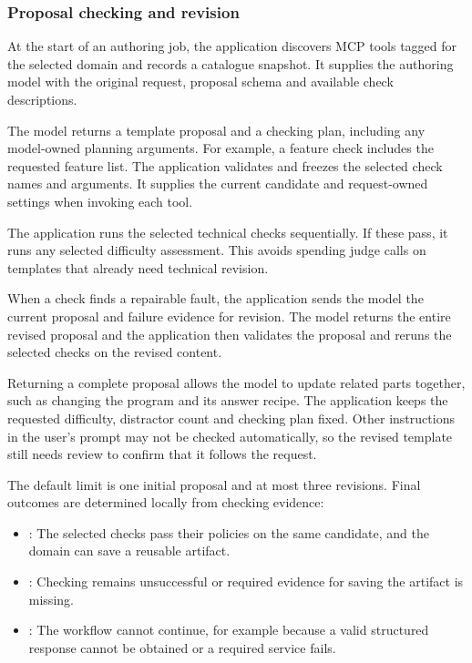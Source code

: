 \subsubsection{Proposal checking and revision}\label{sec:authoring-workflow}

At the start of an authoring job, the application discovers MCP tools tagged for the selected domain and records a catalogue snapshot. It supplies the authoring model with the original request, proposal schema and available check descriptions.

The model returns a template proposal and a checking plan, including any model-owned planning arguments. For example, a feature check includes the requested feature list. The application validates and freezes the selected check names and arguments. It supplies the current candidate and request-owned settings when invoking each tool.



The application runs the selected technical checks sequentially. If these pass, it runs any selected difficulty assessment. This avoids spending judge calls on templates that already need technical revision.

When a check finds a repairable fault, the application sends the model the current proposal and failure evidence for revision. The model returns the entire revised proposal and the application then validates the proposal and reruns the selected checks on the revised content.

Returning a complete proposal allows the model to update related parts together, such as changing the program and its answer recipe. The application keeps the requested difficulty, distractor count and checking plan fixed. Other instructions in the user's prompt may not be checked automatically, so the revised template still needs review to confirm that it follows the request.

The default limit is one initial proposal and at most three revisions. Final outcomes are determined locally from checking evidence:

\begin{itemize}
\item {}: The selected checks pass their policies on the same candidate, and the domain can save a reusable artifact.
\item {}: Checking remains unsuccessful or required evidence for saving the artifact is missing.
\item {}: The workflow cannot continue, for example because a valid structured response cannot be obtained or a required service fails.
\end{itemize}


